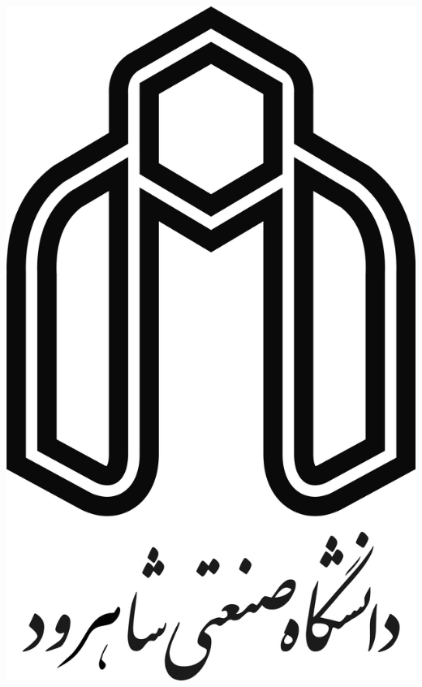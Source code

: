 
\begin{center}

\includegraphics[scale=0.15]{front/template/images/logo.png}

\vspace{-0.2cm}
\ThesisUniversity \\[-0.3em]
\ThesisDepartment

\begin{large}
\vspace{0.5cm}

\ThesisType \ \ThesisDegree \\[-0.3em]
\ThesisMajor


\end{large}
\end{center}
